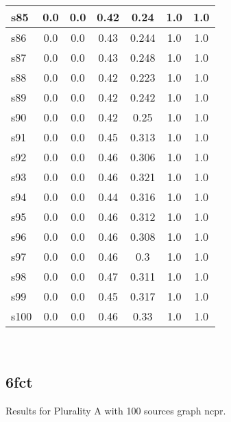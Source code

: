 \documentclass{article}
\begin{document}
\begin{tabular}{|l|c|c|c|c|c|c|}
\hline
s85 &0.0 & 0.0 & 0.42 & 0.24 & 1.0 & 1.0\\
\hline
s86 &0.0 & 0.0 & 0.43 & 0.244 & 1.0 & 1.0\\
\hline
s87 &0.0 & 0.0 & 0.43 & 0.248 & 1.0 & 1.0\\
\hline
s88 &0.0 & 0.0 & 0.42 & 0.223 & 1.0 & 1.0\\
\hline
s89 &0.0 & 0.0 & 0.42 & 0.242 & 1.0 & 1.0\\
\hline
s90 &0.0 & 0.0 & 0.42 & 0.25 & 1.0 & 1.0\\
\hline
s91 &0.0 & 0.0 & 0.45 & 0.313 & 1.0 & 1.0\\
\hline
s92 &0.0 & 0.0 & 0.46 & 0.306 & 1.0 & 1.0\\
\hline
s93 &0.0 & 0.0 & 0.46 & 0.321 & 1.0 & 1.0\\
\hline
s94 &0.0 & 0.0 & 0.44 & 0.316 & 1.0 & 1.0\\
\hline
s95 &0.0 & 0.0 & 0.46 & 0.312 & 1.0 & 1.0\\
\hline
s96 &0.0 & 0.0 & 0.46 & 0.308 & 1.0 & 1.0\\
\hline
s97 &0.0 & 0.0 & 0.46 & 0.3 & 1.0 & 1.0\\
\hline
s98 &0.0 & 0.0 & 0.47 & 0.311 & 1.0 & 1.0\\
\hline
s99 &0.0 & 0.0 & 0.45 & 0.317 & 1.0 & 1.0\\
\hline
s100 &0.0 & 0.0 & 0.46 & 0.33 & 1.0 & 1.0\\
\hline
\end{tabular}\\

\newpage

\subsection{6fct}

\noindent Results for Plurality A with 100 sources graph ncpr.
\end{document}
